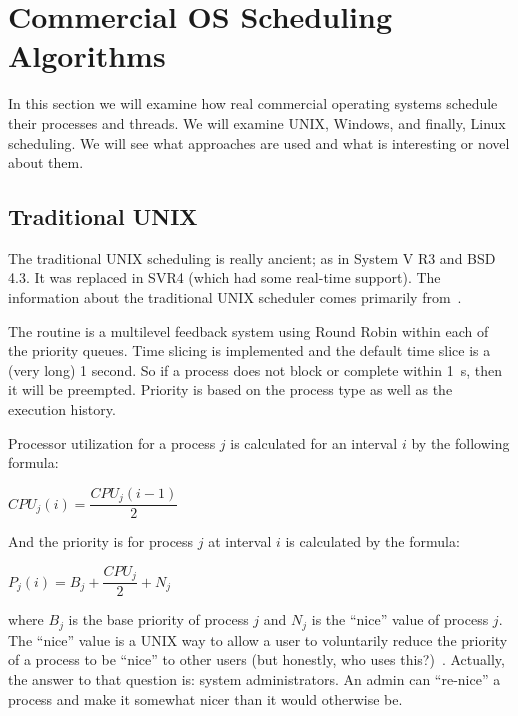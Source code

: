 




\section*{Commercial OS Scheduling Algorithms}

In this section we will examine how real commercial operating systems schedule their processes and threads. We will examine UNIX, Windows, and finally, Linux scheduling. We will see what approaches are used and what is interesting or novel about them.

\subsection*{Traditional UNIX}

The traditional UNIX scheduling is really ancient; as in System V R3 and BSD 4.3. It was replaced in SVR4 (which had some real-time support). The information about the traditional UNIX scheduler comes primarily from~\cite{osi}.

The routine is a multilevel feedback system using Round Robin within each of the priority queues. Time slicing is implemented and the default time slice is a (very long) 1 second. So if a process does not block or complete within 1~s, then it will be preempted. Priority is based on the process type as well as the execution history.

Processor utilization for a process $j$ is calculated for an interval $i$ by the following formula:

\begin{center}
$CPU_{j}(i) = \dfrac{CPU_{j}(i - 1)}{2}$
\end{center}

And the priority is for process $j$ at interval $i$ is calculated by the formula:

\begin{center}
$P_{j}(i) = B_{j} + \dfrac{CPU_{j}}{2} + N_{j}$
\end{center}

where $B_{j}$ is the base priority of process $j$ and $N_{j}$ is the ``nice'' value of process $j$. The ``nice'' value is a UNIX way to allow a user to voluntarily reduce the priority of a process to be ``nice'' to other users (but honestly, who uses this?)~\cite{mos}. Actually, the answer to that question is: system administrators. An admin can ``re-nice'' a process and make it somewhat nicer than it would otherwise be.

